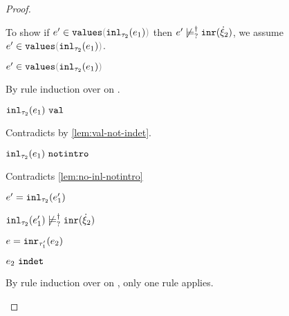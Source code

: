 \begin{proof}
\begin{byCases}
\begin{byCases}
        To show if $\inValues{e'}{\hinl{\tau_2}{e_1}}$ then $e' \not\models_{?}^{\dag} \mathtt{inr}(\dot{\xi}_2)$, we assume $\inValues{e'}{\hinl{\tau_2}{e_1}}$.
        \begin{pfsteps*}
        \item $\inValues{e'}{\hinl{\tau_2}{e_1}}$  
        \end{pfsteps*}
        By rule induction over  on .
        \begin{byCases}
          \item[\text{(\ref{rule:IVVal})}]
          \begin{pfsteps*}
          \item $\mathtt{inl}_{\tau_2}({e_1}) ~\mathtt{val}$ 
          \end{pfsteps*} 
          Contradicts  by \autoref{lem:val-not-indet}.
          \item[\text{(\ref{rule:IVIndet})}] 
          \begin{pfsteps*}
          \item $\mathtt{inl}_{\tau_2}({e_1}) ~\mathtt{notintro}$ 
          \end{pfsteps*} 
          Contradicts \autoref{lem:no-inl-notintro}
          \item[\text{(\ref{rule:IVInl})}] 
          \begin{pfsteps*}
          \item $e'=\mathtt{inl}_{\tau_2}({e_1'})$ 
          \item $\mathtt{inl}_{\tau_2}({e_1'}) \not\models_{?}^{\dag} \mathtt{inr}(\dot{\xi}_2)$ 
          \end{pfsteps*} 
        \end{byCases}
        \item[\text{(\ref{rule:IInr})}] 
        \begin{pfsteps*}
        \item $e=\mathtt{inr}_{\tau_1'}({e_2})$ 
        \item $e_2 ~\mathtt{indet}$  
        \end{pfsteps*} 
        By rule induction over  on , only one rule applies.
        \begin{byCases}
          \item[\text{(\ref{rule:TInr})}]

\end{byCases}
\end{byCases}
\end{byCases}
\end{proof}
